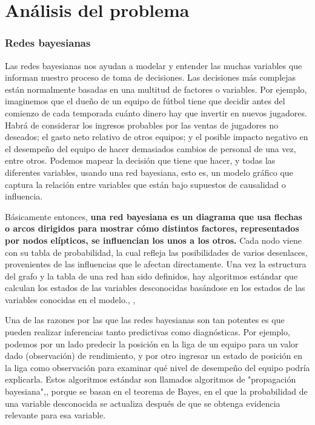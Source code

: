 \chapter{Análisis del problema}
 
\subsection{Redes bayesianas}
Las redes bayesianas nos ayudan a modelar y entender las muchas variables que informan nuestro proceso de 
toma de decisiones. Las decisiones más complejas están normalmente basadas en una multitud de factores o 
variables. Por ejemplo, imaginemos que el dueño de un equipo de fútbol tiene que decidir antes del comienzo 
de cada temporada cuánto dinero hay que invertir en nuevos jugadores. Habrá de considerar los ingresos 
probables por las ventas de jugadores no deseados; el gasto neto relativo de otros
equipos; y el posible impacto negativo en el desempeño del equipo de hacer demasiados cambios de personal de una 
vez, entre otros. Podemos mapear la decisión que tiene que hacer, y todas las diferentes variables, usando 
una red bayesiana, esto es, un modelo gráfico que captura la relación entre variables que están bajo 
supuestos de causalidad o influencia.\cite{things-to-know-BN}

Básicamente entonces, \textbf{una red bayesiana es un diagrama que 
usa flechas o arcos dirigidos para mostrar cómo distintos factores, representados por nodos elípticos, se 
influencian los unos a los otros.} Cada nodo viene con su tabla de probabilidad, la cual refleja las 
posibilidades de varios desenlaces, provenientes de las influencias que le afectan directamente. Una vez 
la estructura del grafo y la tabla de una red han sido definidos, hay algoritmos estándar que 
calculan los estados de las variables desconocidas basándose en los estados de las variables conocidas en el
modelo.\cite{learning-algorithms-BN-comparison}, \cite{BN-achilles-heel}, \cite{different-algorithmic-schemes}

Una de las razones por las que las redes bayesianas son tan potentes es que pueden realizar inferencias 
tanto predictivas como diagnósticas. Por ejemplo, podemos por un lado predecir la posición en la liga de un equipo para 
un valor dado (observación) de rendimiento, y por otro ingresar un estado de posición en la 
liga como observación para examinar qué nivel de desempeño del equipo podría explicarla. Estos algoritmos estándar son
llamados algoritmos de "propagación bayesiana"\cite{Cano2004},\cite{more-algorithms}, \cite{back-prop} porque se basan en el teorema de Bayes, en el que la 
probabilidad de una variable desconocida se actualiza después de que se obtenga evidencia relevante para esa variable.\cite{prop-alg}
